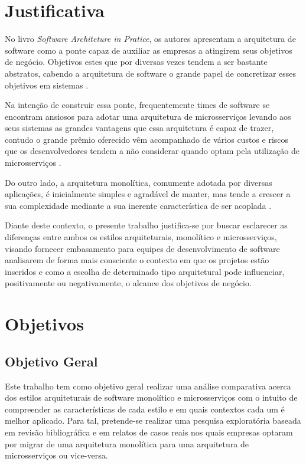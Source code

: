 \section{Justificativa}
\label{justificativa}

No livro \textit{Software Architeture in Pratice}, os autores 
apresentam a arquitetura de software como a ponte capaz de auxiliar as empresas a atingirem seus
objetivos de negócio. Objetivos estes que por diversas vezes tendem a ser bastante abstratos,
cabendo a arquitetura de software o grande papel de concretizar esses objetivos em sistemas
\cite{Bass2015:SoftwareArchitetureInPratice}.

Na intenção de construir essa ponte, frequentemente times de software se encontram ansiosos para
adotar uma arquitetura de microsserviços levando aos seus sistemas as grandes vantagens que essa
arquitetura é capaz de trazer, contudo o grande prêmio oferecido vêm acompanhado de vários custos e
riscos que os desenvolvedores tendem a não considerar quando optam pela utilização de
microsserviços \cite{MartinFowler:MicroservicePremium}.

Do outro lado, a arquitetura monolítica, comumente adotada por diversas aplicações, é inicialmente
simples e agradável de manter, mas tende a crescer a sua complexidade mediante a sua inerente
característica de ser acoplada \cite{StefanTilkov:DontStartWithAMonolith}.

Diante deste contexto, o presente trabalho justifica-se por buscar esclarecer as diferenças entre
ambos os estilos arquiteturais, monolítico e microsserviços, visando fornecer embasamento para equipes
de desenvolvimento de software analisarem de forma mais consciente o contexto em que os projetos
estão inseridos e como a escolha de determinado tipo arquitetural pode influenciar, positivamente ou
negativamente, o alcance dos objetivos de negócio.

\section{Objetivos}

\subsection{Objetivo Geral}
\label{sec:ObjetivoGeral}

Este trabalho tem como objetivo geral realizar uma análise comparativa acerca dos estilos
arquiteturais de software monolítico e microsserviços com o intuito de compreender as
características de cada estilo e em quais contextos cada um é melhor aplicado. Para tal, pretende-se
realizar uma pesquisa exploratória baseada em revisão bibliográfica e em relatos de casos reais nos
quais empresas optaram por migrar de uma arquitetura monolítica para uma arquitetura de
microsserviços ou vice-versa.

